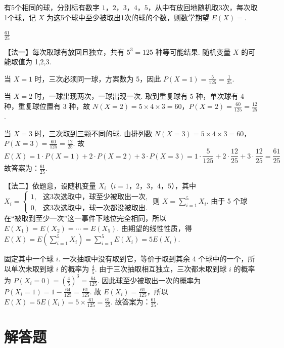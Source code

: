 \documentclass[UTF8,a4paper,oneside,11pt]{ctexbook}
\begin{document}
\begin{problem}
有5个相同的球，分别标有数字 \(1\)，\(2\)，\(3\)，\(4\)，\(5\)，从中有放回地随机取3次，每次取1个球，记 \(X\) 为这5个球中至少被取出1次的球的个数，则数学期望 \(E(X) =\)\fillinblank{}.
\end{problem}

\begin{answer}
\(\frac{61}{25}\)
\end{answer}

\begin{solution}
【法一】每次取球有放回且独立，共有
\(5^3=125\) 种等可能结果. 随机变量 \(X\) 的可能取值为 1,2,3.

当 \(X=1\) 时，三次必须同一球，方案数为 5，因此 \(P(X=1)=\frac{5}{125}=\frac{1}{25}\).

当 \(X=2\) 时，一球出现两次，一球出现一次. 取到重复球有 5 种，单次球有 4 种，重复球位置有 3 种，故 \(N(X=2)=5\times4\times3=60\)，\(P(X=2)=\frac{60}{125}=\frac{12}{25}\).

当 \(X=3\) 时，三次取到三颗不同的球. 由排列数 \(N(X=3)=5\times4\times3=60\)，\(P(X=3)=\frac{60}{125}=\frac{12}{25}\).
故
\[
E(X)=1\cdot P(X=1)+2\cdot P(X=2)+3\cdot P(X=3)=1\cdot\frac{5}{125}+2\cdot\frac{12}{25}+3\cdot\frac{12}{25}=\frac{61}{25}
\]
故答案为：\(\frac{61}{25}\).

【法二】依题意，设随机变量 \(X_i\)（\(i=1\)，\(2\)，\(3\)，\(4\)，\(5\)），其中
\(
X_i=
\begin{cases}
1, & \text{这3次选取中，球至少被取出一次},\\
0, & \text{这3次选取中，球一次都没被取出}.
\end{cases}
\)
则 \(X=\sum_{i=1}^5 X_i\).
由于 5 个球在“被取到至少一次”这一事件下地位完全相同，所以 \(E(X_1)=E(X_2)=\cdots=E(X_5)\). 由期望的线性性质，得 \(E(X)=E\left(\sum_{i=1}^5 X_i\right)=\sum_{i=1}^5 E(X_i)=5E(X_i)\).

固定其中一个球 \(i\). 一次抽取中没有取到它，等价于取到其余 \(4\) 个球中的一个，所以单次未取到球 \(i\) 的概率为 \(\frac{4}{5}\). 由于三次抽取相互独立，三次都未取到球 \(i\) 的概率为 \(P(X_i=0)=\left(\frac{4}{5}\right)^3=\frac{64}{125}\). 因此球至少被取出一次的概率为 \(P(X_i=1)=1-\frac{64}{125}=\frac{61}{125}\). 故 \(E(X_i)=\frac{61}{125}\)，所以 \(E(X)=5E(X_i)=5\times\frac{61}{125}=\frac{61}{25}\).
故答案为：\(\frac{61}{25}\).
\end{solution}
\section{解答题}
\end{document}
